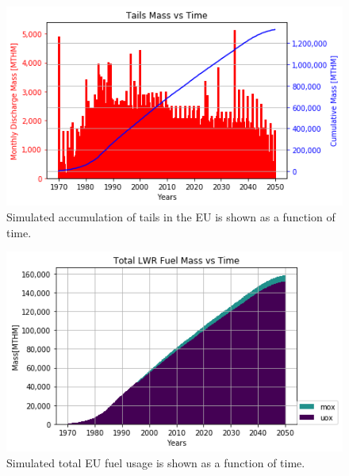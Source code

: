 \begin{figure}[htbp!]
    \begin{center}
        \includegraphics[scale=0.7]{./images/eu_future/tails.png}
    \end{center}
        \caption{Simulated accumulation of tails in the \gls{EU} is shown as a function of time.}
    \label{fig:eu_tail}
\end{figure}

\begin{figure}[htbp!]
    \begin{center}
        \includegraphics[scale=0.7]{./images/eu_future/total_fuel.png}
    \end{center}
\caption{Simulated total \gls{EU} fuel usage is shown as a function of time.}
    \label{fig:eu_fuel}
\end{figure}


